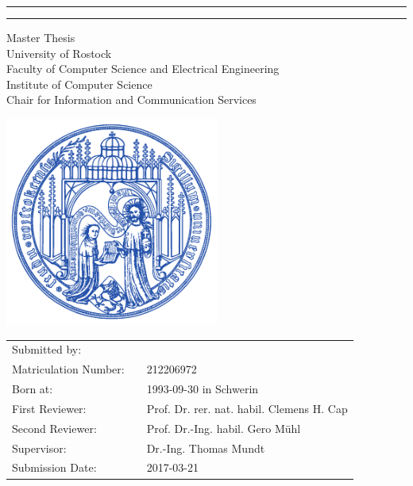 \begin{titlepage}

	\begin{center}
		
		\hrule
		\vspace{0.5cm}
		\LARGE {\bfseries \thetitle}
		\vspace{0.5cm}
		\hrule
		
		\vspace{0.8cm}
		\Large {Master Thesis}\\
		\vspace{1.0cm}
		\large {University of Rostock\\
		Faculty of Computer Science and Electrical Engineering\\
		Institute of Computer Science\\
		Chair for Information and Communication Services}
		
		\vfill
		\includegraphics[width=7cm]{style/UNI-Logo.pdf}
		
	\end{center}
	
	\vfill
	\large
	\begin{tabular}{lcl}
		Submitted by: &&  \theauthor \\
		Matriculation Number: && 212206972\\
		Born at: && 1993-09-30 in Schwerin\\
		First Reviewer: && Prof. Dr. rer. nat. habil. Clemens H. Cap\\
		Second Reviewer: && Prof. Dr.-Ing. habil. Gero Mühl\\
		Supervisor: && Dr.-Ing. Thomas Mundt\\
		Submission Date: && 2017-03-21
	\end{tabular}
	\normalsize
	
	
\end{titlepage}